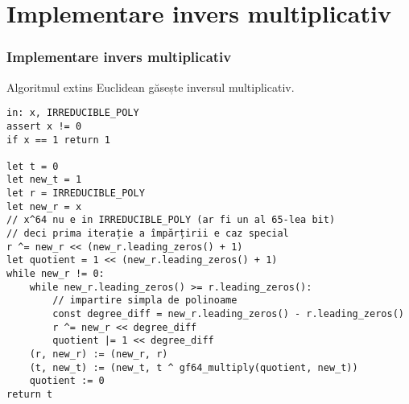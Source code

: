 \documentclass{beamer}
\begin{document}
\section{Implementare invers multiplicativ}
\begin{frame}[fragile]
\frametitle{Implementare invers multiplicativ}
Algoritmul extins Euclidean găsește inversul multiplicativ.

\begin{scriptsize}
\begin{verbatim}
in: x, IRREDUCIBLE_POLY
assert x != 0
if x == 1 return 1

let t = 0
let new_t = 1
let r = IRREDUCIBLE_POLY
let new_r = x
// x^64 nu e in IRREDUCIBLE_POLY (ar fi un al 65-lea bit)
// deci prima iterație a împărțirii e caz special
r ^= new_r << (new_r.leading_zeros() + 1)
let quotient = 1 << (new_r.leading_zeros() + 1)
while new_r != 0:
    while new_r.leading_zeros() >= r.leading_zeros():
        // impartire simpla de polinoame
        const degree_diff = new_r.leading_zeros() - r.leading_zeros()
        r ^= new_r << degree_diff
        quotient |= 1 << degree_diff
    (r, new_r) := (new_r, r)
    (t, new_t) := (new_t, t ^ gf64_multiply(quotient, new_t))
    quotient := 0
return t

\end{verbatim}
\end{scriptsize}

\end{frame}
\end{document}
